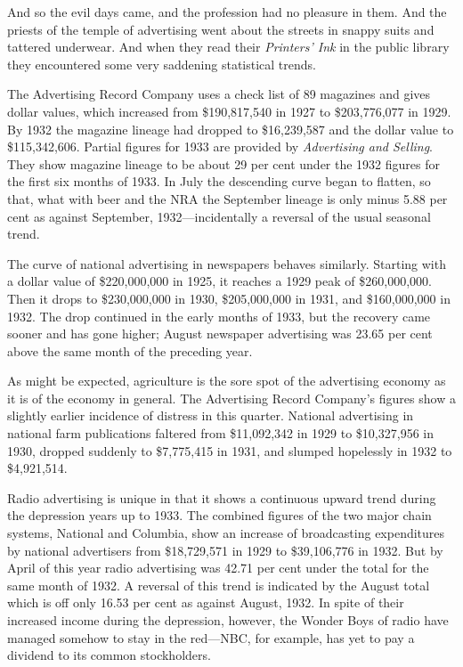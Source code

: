 \documentclass[openany,nobib]{tufte-book}
\begin{document}
And so the evil days came, and the profession had no pleasure in them.
And the priests of the temple of advertising went about the streets in
snappy suits and tattered underwear. And when they read their
\emph{Printers' Ink} in the public library they encountered some very
saddening statistical trends.

The Advertising Record Company uses a check list of 89 magazines and
gives dollar values, which increased from \$190,817,540 in 1927 to
\$203,776,077 in 1929. By 1932 the magazine lineage had dropped to
\$16,239,587 and the dollar value to \$115,342,606. Partial figures for
1933 are provided by \emph{Advertising and Selling}. They show magazine
lineage to be about 29 per cent under the 1932 figures for the first six
months of 1933. In July the descending curve began to flatten, so that,
what with beer and the NRA the September lineage is only minus 5.88 per
cent as against September, 1932---incidentally a reversal of the usual
seasonal trend.

The curve of national advertising in newspapers behaves similarly.
Starting with a dollar value of \$220,000,000 in 1925, it reaches a 1929
peak of \$260,000,000. Then it drops to \$230,000,000 in 1930,
\$205,000,000 in 1931, and \$160,000,000 in 1932. The drop continued in
the early months of 1933, but the recovery came sooner and has gone
higher; August newspaper advertising was 23.65 per cent above the same
month of the preceding year.

As might be expected, agriculture is the sore spot of the advertising
economy as it is of the economy in general. The Advertising Record
Company's figures show a slightly earlier incidence of distress in this
quarter. National advertising in national farm publications faltered
from \$11,092,342 in 1929 to \$10,327,956 in 1930, dropped suddenly to
\$7,775,415 in 1931, and slumped hopelessly in 1932 to \$4,921,514.

Radio advertising is unique in that it shows a continuous upward trend
during the depression years up to 1933. The combined figures of the two
major chain systems, National and Columbia, show an increase of
broadcasting expenditures by national advertisers from \$18,729,571 in
1929 to \$39,106,776 in 1932. But by April of this year radio
advertising was 42.71 per cent under the total for the same month of
1932. A reversal of this trend is indicated by the August total which is
off only 16.53 per cent as against August, 1932. In spite of their
increased income during the depression, however, the Wonder Boys of
radio have managed somehow to stay in the red---NBC, for example, has
yet to pay a dividend to its common stockholders.
\end{document}
